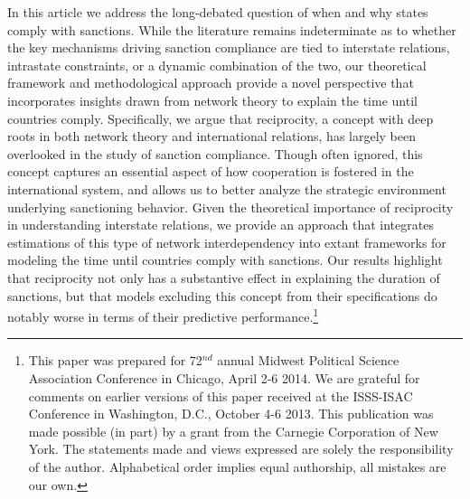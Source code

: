 
In this article we address the long-debated question of when and why states comply with sanctions. While the literature remains indeterminate as to whether the key mechanisms driving sanction compliance are tied to interstate relations, intrastate constraints, or a dynamic combination of the two, our theoretical framework and methodological approach provide a novel perspective that incorporates insights drawn from network theory to explain the time until countries comply. Specifically, we argue that reciprocity, a concept with deep roots in both network theory and international relations, has largely been overlooked in the study of sanction compliance. Though often ignored, this concept captures an essential aspect of how cooperation is fostered in the international system, and allows us to better analyze the strategic environment underlying sanctioning behavior. Given the theoretical importance of reciprocity in understanding interstate relations, we provide an approach that integrates estimations of this type of network interdependency into extant frameworks for modeling the time until countries comply with sanctions. Our results highlight that reciprocity not only has a substantive effect in explaining the duration of sanctions, but that models excluding this concept from their specifications do notably worse in terms of their predictive performance.\footnote{This paper was prepared for 72$^{nd}$ annual Midwest Political Science Association Conference in Chicago, April 2-6 2014. We are grateful for comments on earlier versions of this paper received at the ISSS-ISAC Conference in Washington, D.C., October 4-6 2013. This publication was made possible (in part) by a grant from the Carnegie Corporation of New York. The statements made and views expressed are solely the responsibility of the author. Alphabetical order implies equal authorship, all mistakes are our own.}\\

